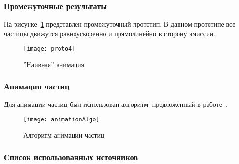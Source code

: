 \begin{frame}
\frametitle{Промежуточные результаты}
На рисунке~\ref{fig:proto4} представлен промежуточный прототип. В данном
прототипе все частицы движутся равноускоренно и прямолинейно в сторону эмиссии.
\begin{figure}[htb]
	\centering
    \texttt{[image: proto4]}
    \caption{''Наивная'' анимация}%
    \label{fig:proto4}
\end{figure}
\end{frame}

\begin{frame}
\frametitle{Анимация частиц}
Для анимации частиц был использован алгоритм, предложенный
в работе~\cite{Somasekaran2005UsingPS}.
\begin{figure}[htb]
	\centering
    \texttt{[image: animationAlgo]}
    \caption{Алгоритм анимации частиц}%
    \label{fig:animationAlgo}
\end{figure}
\end{frame}

\begin{frame}
\frametitle{Список использованных источников}
\sloppy\printbibliography[
    notcategory=AuthorSources,
    heading=none,
    resetnumbers,
]
\end{frame}

